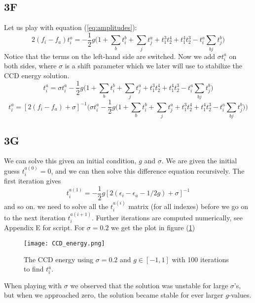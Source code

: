 \documentclass[norsk,a4paper,12pt]{article}
\begin{document}
\subsection*{3F}
Let us play with equation (\ref{eq:amplitudes}):
\begin{equation*}
2(f_i-f_a)t_i^a=-\frac{1}{2}g\bigg(1+\sum_bt_i^b+\sum_jt_j^a+t_1^3t_2^4+t_1^4t_2^3-t_i^a\sum_{bj}t_j^b\bigg)
\end{equation*}
Notice that the terms on the left-hand side are switched. Now we add $\sigma t_i^a$ on both sides, where $\sigma$ is a shift parameter which we later will use to stabilize the CCD energy solution.
\begin{equation*}
[2(f_i-f_a)+\sigma]t_i^a=\sigma t_i^a-\frac{1}{2}g\Big(1+\sum_bt_i^b+\sum_jt_j^a+t_1^3t_2^4+t_1^4t_2^3-t_i^a\sum_{bj}t_j^b\Big)
\end{equation*}
\begin{equation}
t_i^a=[2(f_i-f_a)+\sigma]^{-1}\bigg(\sigma t_i^a-\frac{1}{2}g\Big(1+\sum_bt_i^b+\sum_jt_j^a+t_1^3t_2^4+t_1^4t_2^3-t_i^a\sum_{bj}t_j^b\Big)\bigg)
\end{equation}

\subsection*{3G}
We can solve this given an initial condition, $g$ and $\sigma$. We are given the initial guess $t_i^{a(0)}=0$, and we can then solve this difference equation recursively. The first iteration gives
\begin{equation*}
t_i^{a(1)}=-\frac{1}{2}g[2(\epsilon_i-\epsilon_a-1/2g)+\sigma]^{-1}
\end{equation*}
and so on. we need to solve all the $t_i^{a(i)}$ matrix (for all indexes) before we go on to the next iteration $t_i^{a(i+1)}$. Further iterations are computed numerically, see Appendix E for script. For $\sigma=0.2$ we get the plot in figure (\ref{fig:CCD_energy})
\begin{figure}[H]
\centering
\texttt{[image: CCD\_energy.png]}
\caption{The CCD energy using $\sigma=0.2$ and $g\in[-1,1]$ with 100 iterations to find $t_i^a$. \label{fig:CCD_energy}}
\end{figure}
When playing with $\sigma$ we observed that the solution was unstable for large $\sigma$'s, but when we approached zero, the solution became stable for ever larger $g$-values. 
\end{document}
